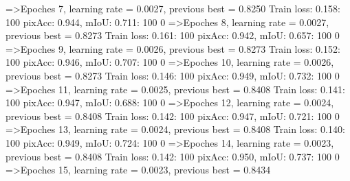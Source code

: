 =>Epoches 7, learning rate = 0.0027,                 previous best = 0.8250
Train loss: 0.158: 100%
pixAcc: 0.944, mIoU: 0.711: 100%
  0%
=>Epoches 8, learning rate = 0.0027,                 previous best = 0.8273
Train loss: 0.161: 100%
pixAcc: 0.942, mIoU: 0.657: 100%
  0%
=>Epoches 9, learning rate = 0.0026,                 previous best = 0.8273
Train loss: 0.152: 100%
pixAcc: 0.946, mIoU: 0.707: 100%
  0%
=>Epoches 10, learning rate = 0.0026,                 previous best = 0.8273
Train loss: 0.146: 100%
pixAcc: 0.949, mIoU: 0.732: 100%
  0%
=>Epoches 11, learning rate = 0.0025,                 previous best = 0.8408
Train loss: 0.141: 100%
pixAcc: 0.947, mIoU: 0.688: 100%
  0%
=>Epoches 12, learning rate = 0.0024,                 previous best = 0.8408
Train loss: 0.142: 100%
pixAcc: 0.947, mIoU: 0.721: 100%
  0%
=>Epoches 13, learning rate = 0.0024,                 previous best = 0.8408
Train loss: 0.140: 100%
pixAcc: 0.949, mIoU: 0.724: 100%
  0%
=>Epoches 14, learning rate = 0.0023,                 previous best = 0.8408
Train loss: 0.142: 100%
pixAcc: 0.950, mIoU: 0.737: 100%
  0%
=>Epoches 15, learning rate = 0.0023,                 previous best = 0.8434
